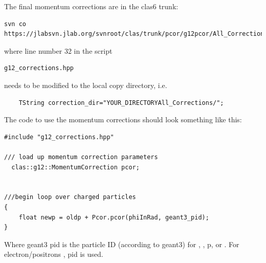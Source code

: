 The final  momentum corrections are in the clas6 trunk:
\begin{verbatim}
svn co https://jlabsvn.jlab.org/svnroot/clas/trunk/pcor/g12pcor/All_Corrections
\end{verbatim}
where line number 32 in the script 
\begin{verbatim}
g12_corrections.hpp
\end{verbatim}
needs to be modified to the local copy directory, i.e.
\begin{verbatim}
    TString correction_dir="YOUR_DIRECTORYAll_Corrections/";
\end{verbatim}

The code to use the momentum corrections should look something like this:
\begin{verbatim}
#include "g12_corrections.hpp"

/// load up momentum correction parameters
  clas::g12::MomentumCorrection pcor;


///begin loop over charged particles
{
    float newp = oldp + Pcor.pcor(phiInRad, geant3_pid);
}
\end{verbatim}

Where geant3 pid is the particle ID (according to geant3) for \π[+], \π[-], p, \K[+] or \K[-]. For electron/positrons \π[-], \π[+] pid is used.

